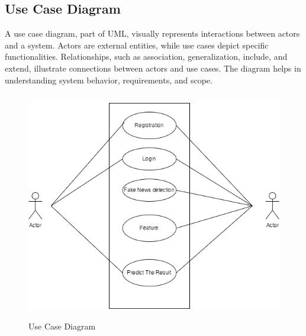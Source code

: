 \subsection{Use Case Diagram}
A use case diagram, part of UML, visually represents interactions between actors and a system. Actors are external entities, while use cases depict specific functionalities. Relationships, such as association, generalization, include, and extend, illustrate connections between actors and use cases. The diagram helps in understanding system behavior, requirements, and scope.
\begin{figure}[H]
    \includegraphics[height = 10cm]{Diagrams/Use-case.drawio.png}
    \caption{Use Case Diagram}
\end{figure}

